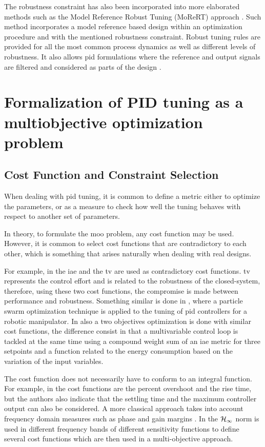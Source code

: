 The robustness constraint has also been incorporated into more elaborated  methods such as the Model Reference Robust Tuning (MoReRT) approach \citep{alfarojopc22}. Such method incorporates a model reference based design within an optimization procedure and with the mentioned robustness constraint. Robust tuning rules are provided for all the most common process dynamics as well as different levels of robustness. It also allows \gls{pid} formulations where the reference and output signals are filtered and considered as parts of the design \citep{alfaroiechr2013}.
%
%
\section{Formalization of PID tuning as a multiobjective optimization problem}
\label{sec:FormPIDMOOP}
\subsection{Cost Function and Constraint Selection}
\label{sec:CostFunSelec}
When dealing with \gls{pid} tuning, it is common to define a metric either to optimize the parameters, or as a measure to check how well the tuning behaves with respect to another set of parameters.

In theory, to formulate the \gls{moo} problem, any cost function may be used. However, it is common to select cost functions that are contradictory to each other, which is something that arises naturally when dealing with real designs.

For example, in \citet{SabinaSanchez2017} the \gls{iae} and the \gls{tv} are used as contradictory cost functions. \gls{tv} represents the control effort and is related to the robustness of the closed-system, therefore, using these two cost functions, the compromise is made between performance and robustness. Something similar is done in \citet{Pierezan2014}, where a particle swarm optimization technique is applied to the tuning of \gls{pid} controllers for a robotic manipulator. In \citet{Zhou2018} also a two objectives optimization is done with similar cost functions, the difference consist in that a multivariable control loop is tackled at the same time using a compound weight sum of an \gls{iae} metric for three setpoints and a function related to the energy consumption based on the variation of the input variables.

The cost function does not necessarily have to conform to an integral function. For example, in \citet{Abbas1995} the cost functions are the percent overshoot  and the rise time, but the authors also indicate that the settling time and the maximum controller output can also be considered. A more classical approach takes into account frequency domain measures such as phase and gain margins \citep{astromhagglun84,hoetal95}. In \citet{Huang2008a} the $\cal{ H}_\infty$ norm is used in different frequency bands of different sensitivity functions to define several cost functions which are then used in a multi-objective approach.

